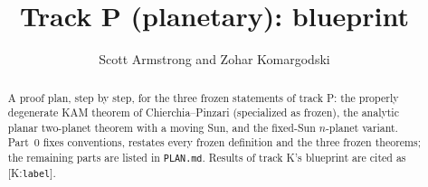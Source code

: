 \documentclass[11pt]{amsart}
\title{Track P (planetary): blueprint}
\author{Scott Armstrong and Zohar Komargodski}
\begin{document}
\begin{abstract}
A proof plan, step by step, for the three frozen statements of track P: the properly degenerate KAM
theorem of Chierchia--Pinzari (specialized as frozen), the analytic planar two-planet theorem with a
moving Sun, and the fixed-Sun $n$-planet variant. Part~0 fixes conventions, restates every frozen
definition and the three frozen theorems; the remaining parts are listed in \texttt{PLAN.md}.
Results of track K's blueprint are cited as \textup{[K:\texttt{label}]}.
\end{abstract}
\maketitle
\tableofcontents























\end{document}
